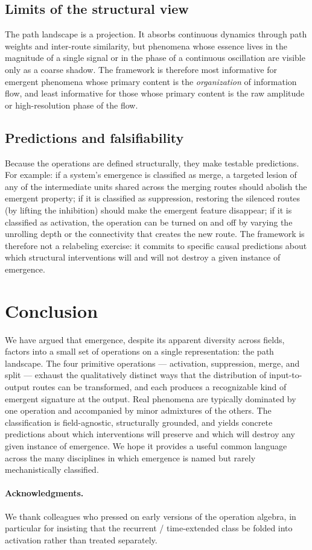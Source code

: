 \documentclass[11pt,a4paper]{article}
\begin{document}
\subsection{Limits of the structural view}

The path landscape is a projection. It absorbs continuous
dynamics through path weights and inter-route similarity, but
phenomena whose essence lives in the magnitude of a single signal
or in the phase of a continuous oscillation are visible only as a
coarse shadow. The framework is therefore most informative for
emergent phenomena whose primary content is the
\emph{organization} of information flow, and least informative
for those whose primary content is the raw amplitude or
high-resolution phase of the flow.

\subsection{Predictions and falsifiability}

Because the operations are defined structurally, they make
testable predictions. For example: if a system's emergence is
classified as merge, a targeted lesion of any of the
intermediate units shared across the merging routes should
abolish the emergent property; if it is classified as
suppression, restoring the silenced routes (by lifting the
inhibition) should make the emergent feature disappear; if it is
classified as activation, the operation can be turned on and off
by varying the unrolling depth or the connectivity that creates
the new route. The framework is therefore not a relabeling
exercise: it commits to specific causal predictions about which
structural interventions will and will not destroy a given
instance of emergence.

\section{Conclusion}

We have argued that emergence, despite its apparent diversity
across fields, factors into a small set of operations on a single
representation: the path landscape. The four primitive operations
--- activation, suppression, merge, and split --- exhaust the
qualitatively distinct ways that the distribution of input-to-output
routes can be transformed, and each produces a recognizable kind
of emergent signature at the output. Real phenomena are typically
dominated by one operation and accompanied by minor admixtures of
the others. The classification is field-agnostic, structurally
grounded, and yields concrete predictions about which interventions
will preserve and which will destroy any given instance of
emergence. We hope it provides a useful common language across
the many disciplines in which emergence is named but rarely
mechanistically classified.

\paragraph{Acknowledgments.} We thank colleagues who pressed on
early versions of the operation algebra, in particular for
insisting that the recurrent / time-extended class be folded into
activation rather than treated separately.
\end{document}

